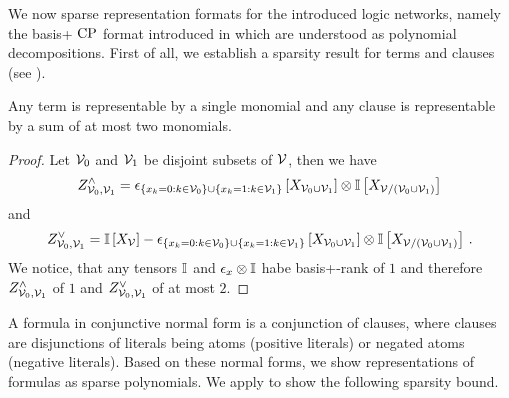 
We now sparse representation formats for the introduced logic networks, namely the basis+ $\mathrm{CP}$ format introduced in  which are understood as polynomial decompositions.
First of all, we establish a sparsity result for terms and clauses (see ).

\begin{lemma}
    \label{lem:clauseTermBasisPlus}
    Any term is representable by a single monomial and any clause is representable by a sum of at most two monomials. %
\end{lemma}
\begin{proof}
    Let $\mathcal{V}_0$ and $\mathcal{V}_1$ be disjoint subsets of $\mathcal{V}$, then we have
    \begin{align*}
        Z^{\land}_{\mathcal{V}_0,\mathcal{V}_1} = \epsilon_{
            \{x_{k} = 0 : k\in\mathcal{V}_0\} \cup \{x_{k} = 1 : k\in\mathcal{V}_1\}
        }\left[X_{\mathcal{V}_0\cup\mathcal{V}_1}\right] \otimes \mathbb{I}\left[X_{\mathcal{V}/(\mathcal{V}_0\cup\mathcal{V}_1)}\right]
    \end{align*}
    and
    \begin{align*}
        Z^{\lor}_{\mathcal{V}_0,\mathcal{V}_1} = \mathbb{I}\left[X_{\mathcal{V}}\right] - \epsilon_{
            \{x_{k} = 0 : k\in\mathcal{V}_0\} \cup \{x_{k} = 1 : k\in\mathcal{V}_1\}
        }\left[X_{\mathcal{V}_0\cup\mathcal{V}_1}\right]
        \otimes \mathbb{I}\left[X_{\mathcal{V}/(\mathcal{V}_0\cup\mathcal{V}_1)}\right] \, .
    \end{align*}
    We notice, that any tensors $\mathbb{I}$ and $\epsilon_{x}\otimes \mathbb{I}$ habe basis+-rank of $1$ and therefore $Z^{\land}_{\mathcal{V}_0,\mathcal{V}_1}$ of $1$ and $Z^{\lor}_{\mathcal{V}_0,\mathcal{V}_1}$ of at most $2$.
\end{proof}

A formula in conjunctive normal form is a conjunction of clauses, where clauses are disjunctions of literals being atoms (positive literals) or negated atoms (negative literals).
Based on these normal forms, we show representations of formulas as sparse polynomials. %
We apply  to show the following sparsity bound. %

